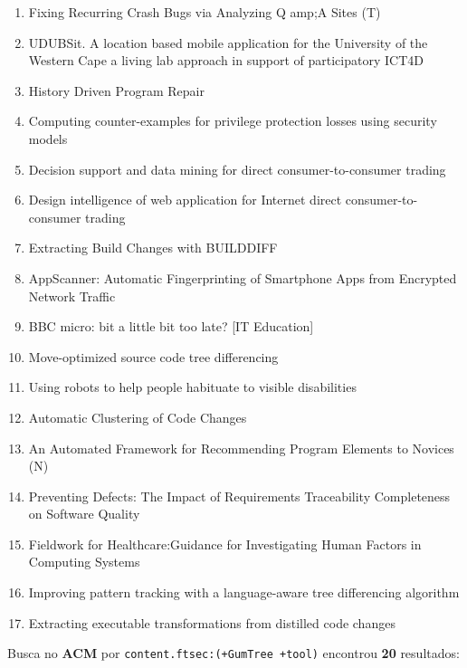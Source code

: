 \begin{enumerate}
\item Fixing Recurring Crash Bugs via Analyzing Q amp;A Sites (T)
\item UDUBSit. A location based mobile application for the University of the Western Cape a living lab approach in support of participatory ICT4D
\item History Driven Program Repair
\item Computing counter-examples for privilege protection losses using security models
\item Decision support and data mining for direct consumer-to-consumer trading
\item Design intelligence of web application for Internet direct consumer-to-consumer trading
\item Extracting Build Changes with BUILDDIFF
\item AppScanner: Automatic Fingerprinting of Smartphone Apps from Encrypted Network Traffic
\item BBC micro: bit a little bit too late? [IT Education]
\item Move-optimized source code tree differencing
\item Using robots to help people habituate to visible disabilities
\item Automatic Clustering of Code Changes
\item An Automated Framework for Recommending Program Elements to Novices (N)
\item Preventing Defects: The Impact of Requirements Traceability Completeness on Software Quality
\item Fieldwork for Healthcare:Guidance for Investigating Human Factors in Computing Systems
\item Improving pattern tracking with a language-aware tree differencing algorithm
\item Extracting executable transformations from distilled code changes
\end{enumerate}

Busca no {\bf ACM} por
\texttt{content.ftsec:(+GumTree +tool)}
encontrou {\bf 20}
resultados:

